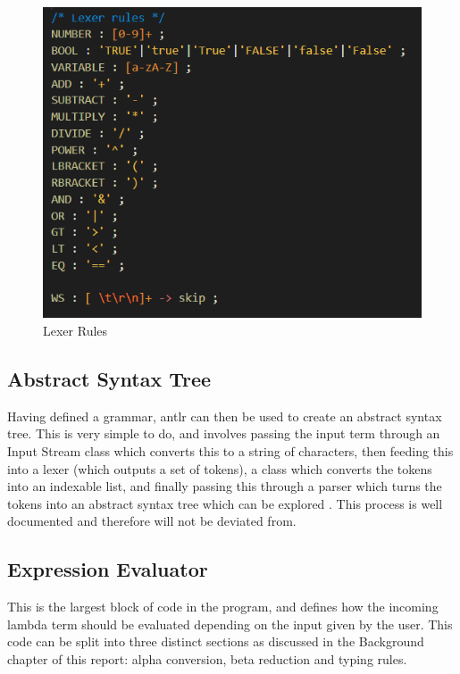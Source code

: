 \documentclass[a4paper,12pt]{report}
\begin{document}
\begin{figure}[p]
\centering
\includegraphics{images/lexer_rules}
\caption{Lexer Rules}
\label{lexer_rules}
\end{figure}

\subsection{Abstract Syntax Tree}

Having defined a grammar, antlr can then be used to create an abstract syntax tree. This is very simple to do, and involves passing the input term through an Input Stream class which converts this to a string of characters, then feeding this into a lexer (which outputs a set of tokens), a class which converts the tokens into an indexable list, and finally passing this through a parser which turns the tokens into an abstract syntax tree which can be explored \cite{Tomassetti2007}. This process is well documented and therefore will not be deviated from.

\subsection{Expression Evaluator}
This is the largest block of code in the program, and defines how the incoming lambda term should be evaluated depending on the input given by the user. This code can be split into three distinct sections as discussed in the Background chapter of this report: alpha conversion, beta reduction and typing rules.
\end{document}
